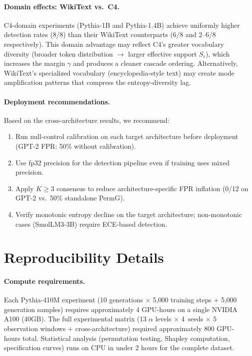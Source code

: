 \paragraph{Domain effects: WikiText vs.\ C4.}
C4-domain experiments (Pythia-1B and Pythia-1.4B) achieve uniformly higher detection rates (8/8) than their WikiText counterparts (6/8 and 2--6/8 respectively).
This domain advantage may reflect C4's greater vocabulary diversity (broader token distribution $\to$ larger effective support $S_\epsilon$), which increases the margin $\gamma$ and produces a cleaner cascade ordering.
Alternatively, WikiText's specialized vocabulary (encyclopedia-style text) may create mode amplification patterns that compress the entropy-diversity lag.

\paragraph{Deployment recommendations.}
Based on the cross-architecture results, we recommend:
\begin{enumerate}
\item Run null-control calibration on each target architecture before deployment (GPT-2 FPR: 50\% without calibration).
\item Use fp32 precision for the detection pipeline even if training uses mixed precision.
\item Apply $K{\geq}3$ consensus to reduce architecture-specific FPR inflation (0/12 on GPT-2 vs.\ 50\% standalone PermG).
\item Verify monotonic entropy decline on the target architecture; non-monotonic cases (SmolLM3-3B) require ECE-based detection.
\end{enumerate}


\section*{Reproducibility Details}
\label{app:reproducibility}

\paragraph{Compute requirements.}
Each Pythia-410M experiment (10 generations $\times$ 5{,}000 training steps $+$ 5{,}000 generation samples) requires approximately 4 GPU-hours on a single NVIDIA A100 (40GB).
The full experimental matrix (13 $\alpha$ levels $\times$ 4~seeds $\times$ 5 observation windows $+$ cross-architecture) required approximately 800 GPU-hours total.
Statistical analysis (permutation testing, Shapley computation, specification curves) runs on CPU in under 2 hours for the complete dataset.


